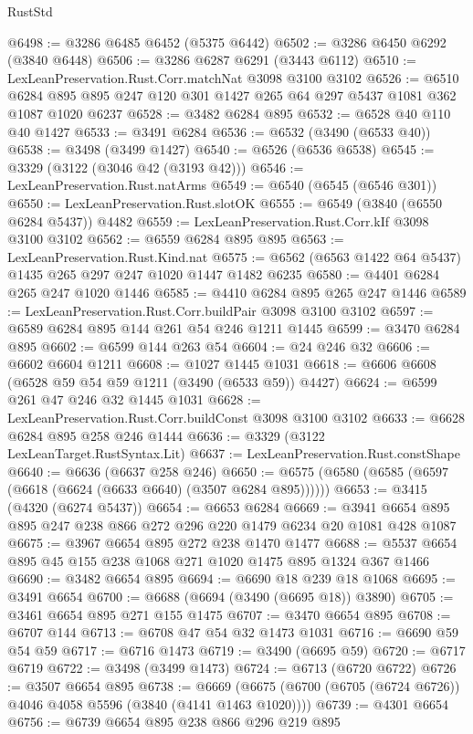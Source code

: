\begin{lexlean}{RustStd}
\begin{coremodule}
@6498 := @3286 @6485 @6452 (@5375 @6442)
@6502 := @3286 @6450 @6292 (@3840 @6448)
@6506 := @3286 @6287 @6291 (@3443 @6112)
@6510 := LexLeanPreservation.Rust.Corr.matchNat @3098 @3100 @3102
@6526 := @6510 @6284 @895 @895 @247 @120 @301 @1427 @265 @64 @297 @5437 @1081 @362 @1087 @1020 @6237
@6528 := @3482 @6284 @895
@6532 := @6528 @40 @110 @40 @1427
@6533 := @3491 @6284
@6536 := @6532 (@3490 (@6533 @40))
@6538 := @3498 (@3499 @1427)
@6540 := @6526 (@6536 @6538)
@6545 := @3329 (@3122 (@3046 @42 (@3193 @42)))
@6546 := LexLeanPreservation.Rust.natArms
@6549 := @6540 (@6545 (@6546 @301))
@6550 := LexLeanPreservation.Rust.slotOK
@6555 := @6549 (@3840 (@6550 @6284 @5437)) @4482
@6559 := LexLeanPreservation.Rust.Corr.kIf @3098 @3100 @3102
@6562 := @6559 @6284 @895 @895
@6563 := LexLeanPreservation.Rust.Kind.nat
@6575 := @6562 (@6563 @1422 @64 @5437) @1435 @265 @297 @247 @1020 @1447 @1482 @6235
@6580 := @4401 @6284 @265 @247 @1020 @1446
@6585 := @4410 @6284 @895 @265 @247 @1446
@6589 := LexLeanPreservation.Rust.Corr.buildPair @3098 @3100 @3102
@6597 := @6589 @6284 @895 @144 @261 @54 @246 @1211 @1445
@6599 := @3470 @6284 @895
@6602 := @6599 @144 @263 @54
@6604 := @24 @246 @32
@6606 := @6602 @6604 @1211
@6608 := @1027 @1445 @1031
@6618 := @6606 @6608 (@6528 @59 @54 @59 @1211 (@3490 (@6533 @59)) @4427)
@6624 := @6599 @261 @47 @246 @32 @1445 @1031
@6628 := LexLeanPreservation.Rust.Corr.buildConst @3098 @3100 @3102
@6633 := @6628 @6284 @895 @258 @246 @1444
@6636 := @3329 (@3122 LexLeanTarget.RustSyntax.Lit)
@6637 := LexLeanPreservation.Rust.constShape
@6640 := @6636 (@6637 @258 @246)
@6650 := @6575 (@6580 (@6585 (@6597 (@6618 (@6624 (@6633 @6640) (@3507 @6284 @895))))))
@6653 := @3415 (@4320 (@6274 @5437))
@6654 := @6653 @6284
@6669 := @3941 @6654 @895 @895 @247 @238 @866 @272 @296 @220 @1479 @6234 @20 @1081 @428 @1087
@6675 := @3967 @6654 @895 @272 @238 @1470 @1477
@6688 := @5537 @6654 @895 @45 @155 @238 @1068 @271 @1020 @1475 @895 @1324 @367 @1466
@6690 := @3482 @6654 @895
@6694 := @6690 @18 @239 @18 @1068
@6695 := @3491 @6654
@6700 := @6688 (@6694 (@3490 (@6695 @18)) @3890)
@6705 := @3461 @6654 @895 @271 @155 @1475
@6707 := @3470 @6654 @895
@6708 := @6707 @144
@6713 := @6708 @47 @54 @32 @1473 @1031
@6716 := @6690 @59 @54 @59
@6717 := @6716 @1473
@6719 := @3490 (@6695 @59)
@6720 := @6717 @6719
@6722 := @3498 (@3499 @1473)
@6724 := @6713 (@6720 @6722)
@6726 := @3507 @6654 @895
@6738 := @6669 (@6675 (@6700 (@6705 (@6724 @6726)) @4046 @4058 @5596 (@3840 (@4141 @1463 @1020))))
@6739 := @4301 @6654
@6756 := @6739
    @6654
    @895
    @238
    @866
    @296
    @219
    @895

\end{coremodule}
\end{lexlean}
